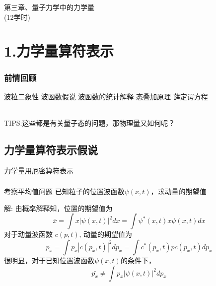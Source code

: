 \begin{frame} [plain]
    \frametitle{}
    \Background[1] 
    \begin{center}
    { {\huge 第三章、量子力学中的力学量 \\ (12学时)}}
    \end{center}  
    \addtocounter{framenumber}{-1}   
\end{frame}

\section{1.力学量算符表示}

\begin{frame}
    \frametitle{前情回顾}
    \begin{itemize}
        \Item 波粒二象性
        \Item 波函数假说
        \Item 波函数的统计解释
        \Item 态叠加原理
        \Item 薛定谔方程
    \end{itemize}
    ~~\\ \vspace{1.0em}
    \hspace{2em}\alert{TIPS:}这些都是有关量子态的问题，那物理量又如何呢？
\end{frame} 

\subsection{力学量算符表示假说}

\begin{frame}    
    \begin{tcolorbox4}
    力学量用厄密算符表示
    \end{tcolorbox4}
\end{frame} 

\begin{frame} 
    \frametitle{}
    \begin{exampleblock}{考察平均值问题}
        已知粒子的位置波函数$\psi(x,t)$，求动量的期望值   
    \end{exampleblock}
    \alert{解:} 由概率解释知，位置的期望值为
    \begin{equation*}
        \bar{x}=\int x|\psi(x, t)|^{2} d x=\int \psi^{*}(x, t) x \psi(x, t) d x
    \end{equation*}
    对于动量波函数 $c(p,t)$, 动量的期望值为
    \begin{equation*}
        \bar{p_x}=\int p_x|c(p_x, t)|^{2} d p_x=\int c^{*}(p_x, t) p c(p_x, t) d p_x
    \end{equation*}
    很明显，对于已知位置波函数$\psi(x,t)$的条件下，
    \begin{equation*}
        \bar{p_x}\neq\int p_x|\psi(x, t)|^{2} d p_x
    \end{equation*}
\end{frame} 

